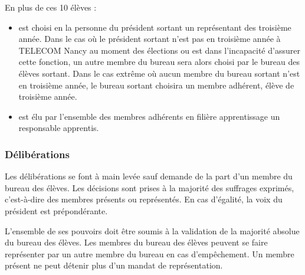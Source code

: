 \documentclass{article}
\begin{document}
				En plus de ces 10 élèves :
				\begin{itemize}
					\item est choisi en la personne du président sortant un
						représentant des troisième année. Dans le cas où le
						président sortant n’est pas en troisième année à TELECOM
						Nancy au moment des élections ou est dans l'incapacité
						d'assurer cette fonction, un autre membre du bureau sera
						alors choisi par le bureau des élèves sortant. Dans le
						cas extrême où aucun membre du bureau sortant n’est en
						troisième année, le bureau sortant choisira un membre
						adhérent, élève de troisième année.
					\item est élu par l’ensemble des membres adhérents en
						filière apprentissage un responsable apprentis.
				\end{itemize}

			\subsubsection{Délibérations}
				Les délibérations se font à main levée sauf demande de la part
				d’un membre du bureau des élèves. Les décisions sont prises à la
				majorité des suffrages exprimés, c’est-à-dire des membres
				présents ou représentés. En cas d'égalité, la voix du président
				est prépondérante.

				L’ensemble de ses pouvoirs doit être soumis à la validation de
				la majorité absolue du bureau des élèves. Les membres du bureau
				des élèves peuvent se faire représenter par un autre membre du
				bureau en cas d’empêchement. Un membre présent ne peut détenir
				plus d’un mandat de représentation.
\end{document}
